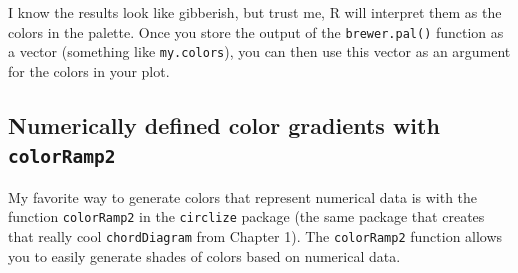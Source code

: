 \documentclass{tufte-book}\usepackage[]{graphicx}\usepackage[]{color}
\begin{document}
I know the results look like gibberish, but trust me, R will interpret them as the colors in the palette. Once you store the output of the \texttt{brewer.pal()} function as a vector (something like \texttt{my.colors}), you can then use this vector as an argument for the colors in your plot.

\subsection{Numerically defined color gradients with \texttt{colorRamp2}}

My favorite way to generate colors that represent numerical data is with the function \texttt{colorRamp2} in the \texttt{circlize} package (the same package that creates that really cool \texttt{chordDiagram} from Chapter 1). The \texttt{colorRamp2} function allows you to easily generate shades of colors based on numerical data.
\end{document}

